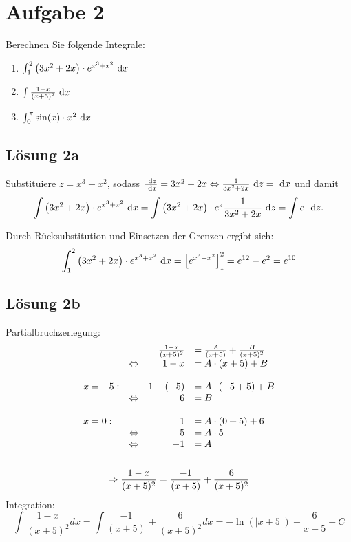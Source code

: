 \documentclass[main.tex]{subfiles}
\begin{document}
\section{Aufgabe 2}
Berechnen Sie folgende Integrale:
\begin{enumerate}
    \item $\int _{1}^{2}\left( 3x^{2} +2x\right) \cdotp e^{x^{3} +x^{2}} \dx$
    \item $\int \frac{1-x}{( x+5)^{2}} \dx$
    \item $\int _{0}^{\pi }\sin( x) \cdotp x^{2} \dx$
\end{enumerate}

\subsection{Lösung 2a}
Substituiere $z=x^{3} +x^{2}$, sodass $\frac{~\mathrm{d}z}{\dx} =3x^{2} +2x\Leftrightarrow \frac{1}{3x^{2} +2x} ~\mathrm{d}z=\dx$ und damit
\begin{equation*}
    \int \left( 3x^{2} +2x\right) \cdotp e^{x^{3} +x^{2}} \dx=\int \left( 3x^{2} +2x\right) \cdotp e^{z}\frac{1}{3x^{2} +2x} ~\mathrm{d}z=\int e\ ~\mathrm{d}z.
\end{equation*}

Durch Rücksubstitution und Einsetzen der Grenzen ergibt sich:
\begin{equation*}
    \int _{1}^{2}\left( 3x^{2} +2x\right) \cdotp e^{x^{3} +x^{2}} \dx=\left[ e^{x^{3} +x^{2}}\right]_{1}^{2} =e^{12} -e^{2} =e^{10}
\end{equation*}

\subsection{Lösung 2b}
Partialbruchzerlegung:
\begin{gather*}
    \begin{array}{ l c r l }
    &  & \frac{1-x}{( x+5)^{2}} & =\frac{A}{( x+5)} +\frac{B}{( x+5)^{2}}\\
    & \Leftrightarrow  & 1-x & =A\cdotp ( x+5) +B\\
    &  &  & \\
    x=-5: &  & 1-( -5) & =A\cdotp ( -5+5) +B\\
    & \Leftrightarrow  & 6 & =B\\
    &  &  & \\
    x=0: &  & 1 & =A\cdotp ( 0+5) +6\\
    & \Leftrightarrow  & -5 & =A\cdotp 5\\
    & \Leftrightarrow  & -1 & =A
    \end{array}\\
    \\
    \Rightarrow \frac{1-x}{( x+5)^{2}} =\frac{-1}{( x+5)} +\frac{6}{( x+5)^{2}}
\end{gather*}
Integration:
\begin{equation*}
    \int \frac{1-x}{( x+5)^{2}} dx=\int \frac{-1}{( x+5)} +\frac{6}{( x+5)^{2}} dx=-\ln( |x+5|) -\frac{6}{x+5} +C
\end{equation*}
\end{document}
